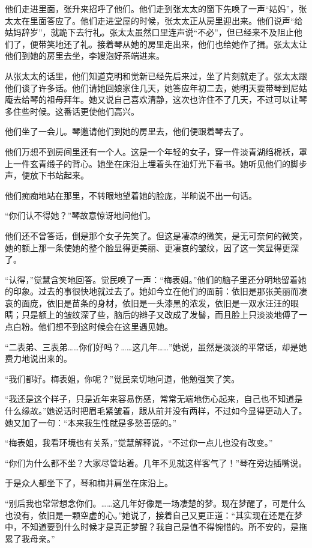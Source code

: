 \par 他们走进里面，张升来招呼了他们。他们走到张太太的窗下先唤了一声“姑妈”，张太太在里面答应了。他们走进堂屋的时候，张太太正从房里迎出来。他们说声“给姑妈辞岁”，就跪下去行礼。张太太虽然口里连声说“不必”，但已经来不及阻止他们了，便带笑地还了礼。接着琴从她的房里走出来，他们也给她作了揖。张太太让他们到她的房里去坐，李嫂泡好茶端进来。
\par 从张太太的话里，他们知道克明和觉新已经先后来过，坐了片刻就走了。张太太跟他们谈了许多话。他们请她回娘家住几天，她答应年初二去，她明天要带琴到尼姑庵去给琴的祖母拜年。她又说自己喜欢清静，这次也许住不了几天，不过可以让琴多住些时候。这番话更使他们高兴。
\par 他们坐了一会儿。琴邀请他们到她的房里去，他们便跟着琴去了。
\par 他们万想不到房间里还有一个人。这是一个年轻的女子，穿一件淡青湖绉棉袄，罩上一件玄青缎子的背心。她坐在床沿上埋着头在油灯光下看书。她听见他们的脚步声，便放下书站起来。
\par 他们痴痴地站在那里，不转眼地望着她的脸庞，半晌说不出一句话。
\par “你们认不得她？”琴故意惊讶地问他们。
\par 他们还不曾答话，倒是那个女子先笑了。但这是凄凉的微笑，是无可奈何的微笑，她的额上那一条使她的整个脸显得更美丽、更凄哀的皱纹，因了这一笑显得更深了。
\par “认得，”觉慧含笑地回答。觉民唤了一声：“梅表姐。”他们的脑子里还分明地留着她的印象。过去的事很快地就过去了。她如今立在他们的面前：依旧是那张美丽而凄哀的面庞，依旧是苗条的身材，依旧是一头漆黑的浓发，依旧是一双水汪汪的眼睛；只是额上的皱纹深了些，脑后的辫子又改成了发髻，而且脸上只淡淡地傅了一点白粉。他们想不到这时候会在这里遇见她。
\par “二表弟、三表弟……你们好吗？……这几年……”她说，虽然是淡淡的平常话，却是她费力地说出来的。
\par “我们都好。梅表姐，你呢？”觉民亲切地问道，他勉强笑了笑。
\par “我还是这个样子，只是近年来容易伤感，常常无端地伤心起来，自己也不知道是什么缘故。”她说话时把眉毛紧皱着，跟从前并没有两样，不过如今显得更动人了。她又加了一句：“本来我生性就是多愁善感的。”
\par “梅表姐，我看环境也有关系，”觉慧解释说，“不过你一点儿也没有改变。”
\par “你们为什么都不坐？大家尽管站着。几年不见就这样客气了！”琴在旁边插嘴说。
\par 于是众人都坐下了，琴和梅并肩坐在床沿上。
\par “别后我也常常想念你们。……这几年好像是一场凄楚的梦。现在梦醒了，可是什么也没有，依旧是一颗空虚的心。”她说了，接着自己又更正道：“其实现在还是在梦中，不知道要到什么时候才是真正梦醒？我自己是值不得惋惜的。所不安的，是拖累了我母亲。”
